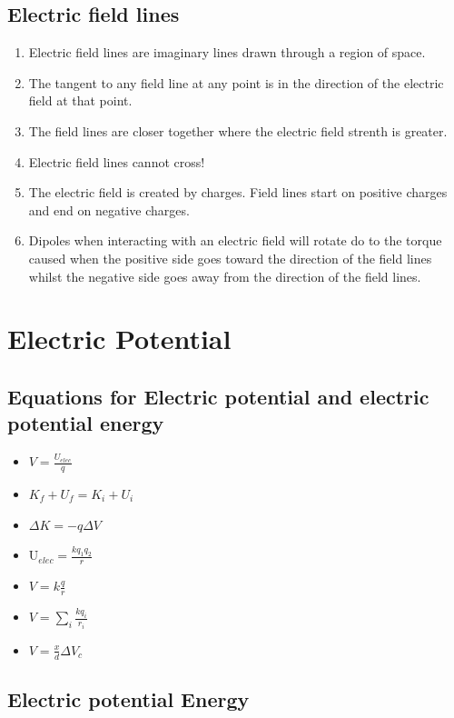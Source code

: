 \documentclass{report}   
\begin{document}
\section{Electric field lines}
\begin{enumerate}
  \item Electric field lines are imaginary lines drawn through a region of space. 
  \item The tangent to any field line at any point is in the direction  of the electric field at that point.
  \item The  field lines are closer together where the electric field strenth is greater.
  \item Electric field lines cannot cross!
  \item The electric field is created by charges. Field lines start  on positive charges and end on negative charges.
  \item Dipoles when interacting with an  electric field will  rotate do to the torque caused when the positive side goes toward the direction of the field lines whilst the negative side goes away from the direction of the field lines.
\end{enumerate}


\chapter{Electric Potential}

\section{Equations for Electric potential and electric potential energy} 

\begin{itemize}
  \item $ \textit{V} = \frac{\textit{U}_{elec}}{\textit{q}} $
  \item $ K_f + U_f = K_i + U_i $
  \item $ \Delta K = -q \Delta \textit{V} $
  \item $ \mathrm{U}_{elec} = \frac{kq_1q_2}{r} $
  \item $ \textit{V} = k \frac{q}{r} $
  \item $ V = \sum_{i} \frac{kq_i}{r_i} $
  \item $ V = \frac{x}{d} \Delta \textit{V}_c$
\end{itemize}

\section{Electric potential Energy}
\end{document}
